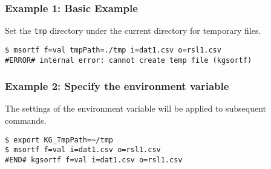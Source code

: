 \subsubsection*{Example 1: Basic Example}

Set the \verb|tmp| directory under the current directory for temporary files.


\begin{Verbatim}[baselinestretch=0.7,frame=single]
$ msortf f=val tmpPath=./tmp i=dat1.csv o=rsl1.csv
#ERROR# internal error: cannot create temp file (kgsortf)
\end{Verbatim}
\subsubsection*{Example 2: Specify the environment variable}

The settings of the environment variable will be applied to subsequent commands.


\begin{Verbatim}[baselinestretch=0.7,frame=single]
$ export KG_TmpPath=~/tmp
$ msortf f=val i=dat1.csv o=rsl1.csv
#END# kgsortf f=val i=dat1.csv o=rsl1.csv
\end{Verbatim}

